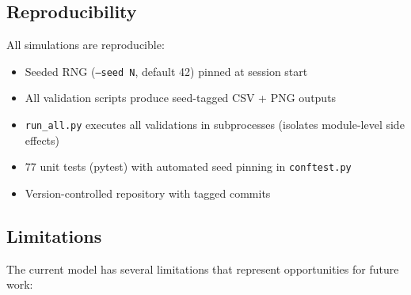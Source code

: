 \documentclass[11pt,a4paper]{article}
\begin{document}
\subsection{Reproducibility}

All simulations are reproducible:
\begin{itemize}[nosep]
  \item Seeded RNG (\texttt{--seed N}, default 42) pinned at session start
  \item All validation scripts produce seed-tagged CSV + PNG outputs
  \item \texttt{run\_all.py} executes all validations in subprocesses
    (isolates module-level side effects)
  \item 77 unit tests (pytest) with automated seed pinning in
    \texttt{conftest.py}
  \item Version-controlled repository with tagged commits
\end{itemize}

\subsection{Limitations}

The current model has several limitations that represent opportunities
for future work:
\end{document}
